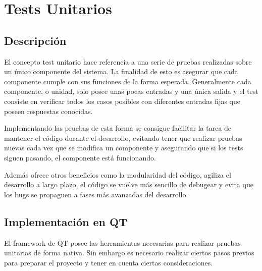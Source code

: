 
\pagestyle{fancy}
\fancyhead[LE,RO]{\thepage}
\fancyhead[LO]{\nouppercase{\rightmark}}

\chapter{Tests Unitarios}

\minitoc

\section{Descripción}

El concepto test unitario hace referencia a una serie de pruebas realizadas sobre un único componente del sistema. La finalidad de esto es asegurar que cada componente cumple con sus funciones de la forma esperada. Generalmente cada componente, o unidad, solo posee unas pocas entradas y una única salida y el test consiste en verificar todos los casos posibles con diferentes entradas fijas que poseen respuestas conocidas.

Implementando las pruebas de esta forma se consigue facilitar la tarea de mantener el código durante el desarrollo, evitando tener que realizar pruebas nuevas cada vez que se modifica un componente y asegurando que si los tests siguen pasando, el componente está funcionando.

Además ofrece otros beneficios como la modularidad del código, agiliza el desarrollo a largo plazo, el código se vuelve más sencillo de debugear y evita que los bugs se propaguen a fases más avanzadas del desarrollo.

\section{Implementación en QT}

El framework de QT posee las herramientas necesarias para realizar pruebas unitarias de forma nativa. Sin embargo es necesario realizar ciertos pasos previos para preparar el proyecto y tener en cuenta ciertas consideraciones.


